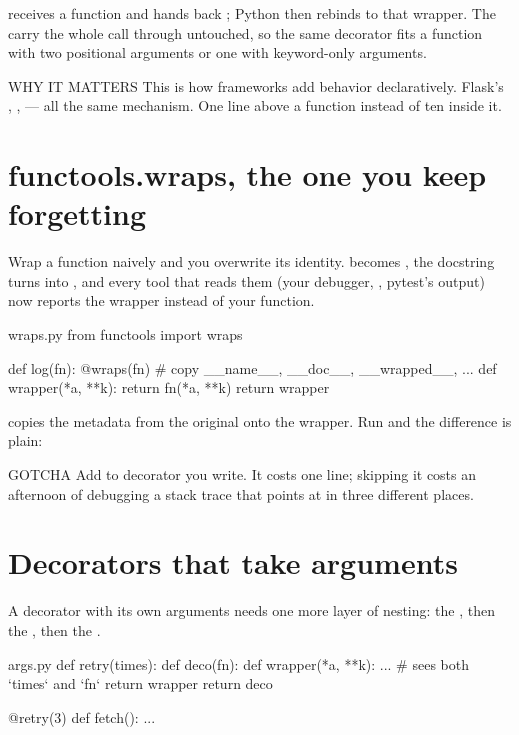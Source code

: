  receives a function and hands back ; Python then rebinds  to that wrapper. The  carry the whole call through untouched, so the same decorator fits a function with two positional arguments or one with keyword-only arguments.

\begin{callout}{WHY IT MATTERS}
This is how frameworks add behavior declaratively. Flask's , ,  — all the same mechanism. One line above a function instead of ten inside it.
\end{callout}

\section{functools.wraps, the one you keep forgetting}

Wrap a function naively and you overwrite its identity.  becomes , the docstring turns into , and every tool that reads them (your debugger, , pytest's output) now reports the wrapper instead of your function.

\begin{pycard}{wraps.py}
from functools import wraps

def log(fn):
    @wraps(fn)          # copy __name__, __doc__, __wrapped__, ...
    def wrapper(*a, **k):
        return fn(*a, **k)
    return wrapper
\end{pycard}

 copies the metadata from the original onto the wrapper. Run  and the difference is plain:

\begin{callout}[dotamber]{GOTCHA}
Add  to  decorator you write. It costs one line; skipping it costs an afternoon of debugging a stack trace that points at  in three different places.
\end{callout}

\section{Decorators that take arguments}

A decorator with its own arguments needs one more layer of nesting: the , then the , then the .

\begin{pycard}{args.py}
def retry(times):
    def deco(fn):
        def wrapper(*a, **k):
            ...            # sees both `times` and `fn`
        return wrapper
    return deco

@retry(3)
def fetch(): ...
\end{pycard}

